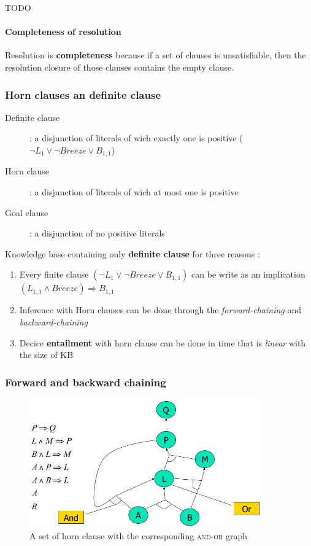 TODO

\paragraph{Completeness of resolution}
Resolution is \textbf{completeness} because if a set of clauses is unsatisfiable, then
the resolution closure of those clauses contains the empty clause.


\subsubsection{Horn clauses an definite clause}
\begin{description}
    \item[Definite clause] : a disjunction of literals of wich exactly one is positive 
        ($\neg L_1 \vee \neg Breeze \vee B_{1,1}$)
    \item[Horn clause] : a disjunction of literals of wich at most one is positive
    \item[Goal clause ] : a disjunction of no positive literals
\end{description}

Knowledge base containing only \textbf{definite clause} for three reasons :
\begin{enumerate}
    \item Every finite clause $(\neg L_1 \vee \neg Breeze \vee B_{1,1})$ can be write as an 
        implication$(L_{1,1} \wedge Breeze) \Rightarrow B_{1,1}$
    \item Inference with Horn clauses can be done through the \textit{forward-chaining} and 
        \textit{backward-chaining}
    \item Decice \textbf{entailment} with horn clause can be done in time
        that is \textit{linear} with the size of KB
\end{enumerate}

\subsubsection{Forward and backward chaining}

\begin{figure}[h]
    \centering
    \includegraphics[width=10cm]{andor.png}
    \caption{A set of horn clause with the corresponding \textsc{and-or} graph}
\end{figure}


